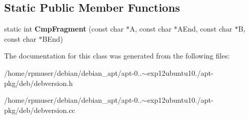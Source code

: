 \subsection*{\-Static \-Public \-Member \-Functions}
\begin{DoxyCompactItemize}
\item 
static int {\bfseries \-Cmp\-Fragment} (const char $\ast$\-A, const char $\ast$\-A\-End, const char $\ast$\-B, const char $\ast$\-B\-End)\label{classdebVersioningSystem_a2c013b6f327bdb302d0dcfcb646f1472}

\end{DoxyCompactItemize}


\-The documentation for this class was generated from the following files\-:\begin{DoxyCompactItemize}
\item 
/home/rpmuser/debian/debian\-\_\-apt/apt-\/0..$\sim$exp12ubuntu10./apt-\/pkg/deb/debversion.\-h\item 
/home/rpmuser/debian/debian\-\_\-apt/apt-\/0..$\sim$exp12ubuntu10./apt-\/pkg/deb/debversion.\-cc\end{DoxyCompactItemize}
